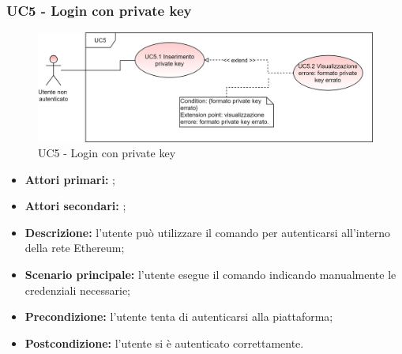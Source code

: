 \subsubsection{UC5 - Login con private key}
\begin{figure}[h]
	\centering
	\includegraphics[scale=\ucs]{./res/img/UC5.png}
	\caption {UC5 - Login con private key}
\end{figure}
\begin{itemize}
	\item \textbf{Attori primari:} \una{};
	\item \textbf{Attori secondari:} \re{};
	\item \textbf{Descrizione:} l’utente può utilizzare il comando \ploginPrivate{} per autenticarsi all’interno della rete Ethereum; 
	\item \textbf{Scenario principale:} l'utente esegue il comando \login{} indicando manualmente le credenziali necessarie; 
	\item \textbf{Precondizione:} l’utente tenta di autenticarsi alla piattaforma;
	\item \textbf{Postcondizione:} l’utente si è autenticato correttamente.
\end{itemize}
